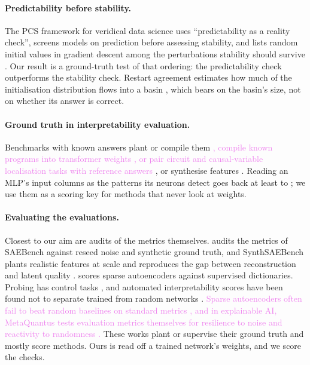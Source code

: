 \documentclass[10pt]{article}
\newcommand{\draft}[1]{\textcolor{violet}{#1}}
\begin{document}
\paragraph{Predictability before stability.} The PCS framework for veridical data science
uses ``predictability as a reality check'', screens models on prediction before assessing
stability, and lists random initial values in gradient descent among the perturbations
stability should survive \citep{yu2020veridical}. Our result is a ground-truth test of that
ordering: the predictability check outperforms the stability check. Restart agreement
estimates how much of the initialisation distribution flows into a basin \citep{nehzati2026restarts}, which bears on the
basin's size, not on whether its answer is correct.

\paragraph{Ground truth in interpretability evaluation.} Benchmarks with known answers
plant or compile them \citep{gupta2024interpbench}\draft{, compile known programs into
transformer weights \citep{lindner2023tracr}, or pair circuit and causal-variable
localisation tasks with reference answers \citep{mueller2025mib}}, or synthesise features
\citep{song2025position,chanin2026synthsaebench,clark2024exact}. Reading an MLP's input columns as the
patterns its neurons detect goes back at least to \citet{geva2021keyvalue}; we use them as a
scoring key for methods that never look at weights.

\paragraph{Evaluating the evaluations.} Closest to our aim are audits of the metrics
themselves. \citet{chanin2026benchmarks} audits the metrics of SAEBench
\citep{karvonen2025saebench} against reseed noise and synthetic ground truth, and
SynthSAEBench plants realistic features at scale and reproduces the gap between
reconstruction and latent quality \citep{chanin2026synthsaebench}.
\citet{makelov2024principled} scores sparse autoencoders against supervised dictionaries.
Probing has control tasks \citep{hewitt2019control}, and automated interpretability scores
\draft{\citep{bills2023explain}} have been found not to separate trained from random networks \citep{heap2025random}.
\draft{Sparse autoencoders often fail to beat random baselines on standard metrics
\citep{korznikov2026sanity}, and in explainable AI, MetaQuantus tests evaluation metrics
themselves for resilience to noise and reactivity to randomness \citep{hedstrom2023metaquantus}.} These
works plant or supervise their ground truth and mostly score methods. Ours is read off a
trained network's weights, and we score the checks.
\end{document}
